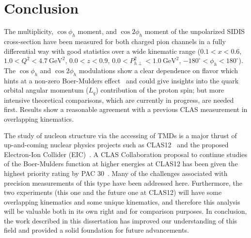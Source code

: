 \chapter{Conclusion}
\label{cha:Conclusion}

The multiplicity, $\cos\phi_h$ moment, and $\cos 2\phi_h$ moment of the unpolarized SIDIS cross-section have been measured for both charged pion channels in a fully differential way with good statistics over a wide kinematic range ($0.1 < x < 0.6$, $1.0 < Q^2 < 4.7\ \text{GeV}^2$, $0.0 < z < 0.9$, $0.0 < P_{h\perp}^2 < 1.0\ \text{GeV}^2$, $-180^\circ < \phi_h < 180^\circ$).
The $\cos\phi_h$ and $\cos 2\phi_h$ modulations show a clear dependence on flavor which hints at a non-zero Boer-Mulders effect~\cite{Gamberg08}\cite{Barone08}\cite{Zhang08}\cite{Barone10} and could give insights into the quark orbital angular momentum ($L_q$) contribution of the proton spin; but more intensive theoretical comparisons, which are currently in progress, are needed first.
Results show a reasonable agreement with a previous CLAS measurement in overlapping kinematics.

The study of nucleon structure via the accessing of TMDs is a major thrust of up-and-coming nuclear physics projects such as CLAS12~\cite{Burkert08} and the proposed Electron-Ion Collider (EIC)~\cite{Boer11}.
A CLAS Collaboration proposal to continue studies of the Boer-Mulders function at higher energies at CLAS12 has been given the highest priority rating by PAC 30~\cite{Avakian06}.
Many of the challenges associated with precision measurements of this type have been addressed here.
Furthermore, the two experiments (this one and the future one at CLAS12) will have some overlapping kinematics and some unique kinematics, and therefore this analysis will be valuable both in its own right and for comparison purposes.
In conclusion, the work described in this dissertation has improved our understanding of this field and provided a solid foundation for future advancements.

